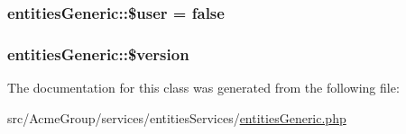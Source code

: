 \hypertarget{classentities_generic_a5d3c6b16b1694033bbc4856cfa0882eb}{
\subsubsection[{\$user}]{\setlength{\rightskip}{0pt plus 5cm}entities\+Generic\+::\$user = {\bf false}\hspace{0.3cm}{\ttfamily [protected]}}}\label{classentities_generic_a5d3c6b16b1694033bbc4856cfa0882eb}
\hypertarget{classentities_generic_aec5f1253261f6f67ab720dd863acad50}{
\subsubsection[{\$version}]{\setlength{\rightskip}{0pt plus 5cm}entities\+Generic\+::\$version\hspace{0.3cm}{\ttfamily [protected]}}}\label{classentities_generic_aec5f1253261f6f67ab720dd863acad50}


The documentation for this class was generated from the following file\+:\begin{DoxyCompactItemize}
\item 
src/\+Acme\+Group/services/entities\+Services/\hyperlink{entities_generic_8php}{entities\+Generic.\+php}\end{DoxyCompactItemize}
